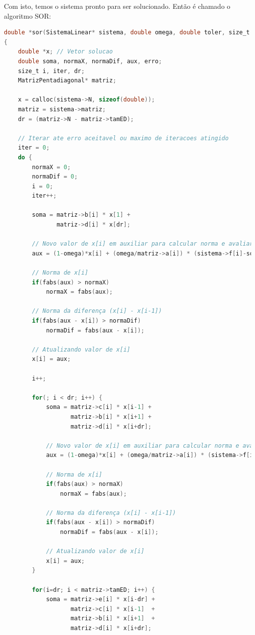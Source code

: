 \documentclass[
	11pt,				%
	oneside,			%
	a4paper,			%
	english,			%
	brazil,				%
	]{article}
\begin{document}
Com isto, temos o sistema pronto para ser solucionado. Então é chamado o 
algoritmo SOR:
\begin{lstlisting}[language=C, caption=Função SOR normal]
double *sor(SistemaLinear* sistema, double omega, double toler, size_t iterMax)
{
	double *x; // Vetor solucao
	double soma, normaX, normaDif, aux, erro;
	size_t i, iter, dr;
    MatrizPentadiagonal* matriz;

	x = calloc(sistema->N, sizeof(double));
    matriz = sistema->matriz;
    dr = (matriz->N - matriz->tamED);

    // Iterar ate erro aceitavel ou maximo de iteracoes atingido
	iter = 0;
	do {
        normaX = 0;
        normaDif = 0;
        i = 0;
		iter++;

        soma = matriz->b[i] * x[1] +
               matriz->d[i] * x[dr];

        // Novo valor de x[i] em auxiliar para calcular norma e avaliar erro
        aux = (1-omega)*x[i] + (omega/matriz->a[i]) * (sistema->f[i]-soma);
        
        // Norma de x[i]
        if(fabs(aux) > normaX)
            normaX = fabs(aux);

        // Norma da diferença (x[i] - x[i-1])
        if(fabs(aux - x[i]) > normaDif)
            normaDif = fabs(aux - x[i]);

        // Atualizando valor de x[i]
        x[i] = aux;

        i++;

        for(; i < dr; i++) {
            soma = matriz->c[i] * x[i-1] +
                   matriz->b[i] * x[i+1] +
                   matriz->d[i] * x[i+dr];

            // Novo valor de x[i] em auxiliar para calcular norma e avaliar erro
            aux = (1-omega)*x[i] + (omega/matriz->a[i]) * (sistema->f[i]-soma);

            // Norma de x[i]
            if(fabs(aux) > normaX)
                normaX = fabs(aux);

            // Norma da diferença (x[i] - x[i-1])
            if(fabs(aux - x[i]) > normaDif)
                normaDif = fabs(aux - x[i]);

            // Atualizando valor de x[i]
            x[i] = aux;
        }

        for(i=dr; i < matriz->tamED; i++) {
            soma = matriz->e[i] * x[i-dr] +
                   matriz->c[i] * x[i-1]  +
                   matriz->b[i] * x[i+1]  +
                   matriz->d[i] * x[i+dr];


\end{lstlisting}
\end{document}
